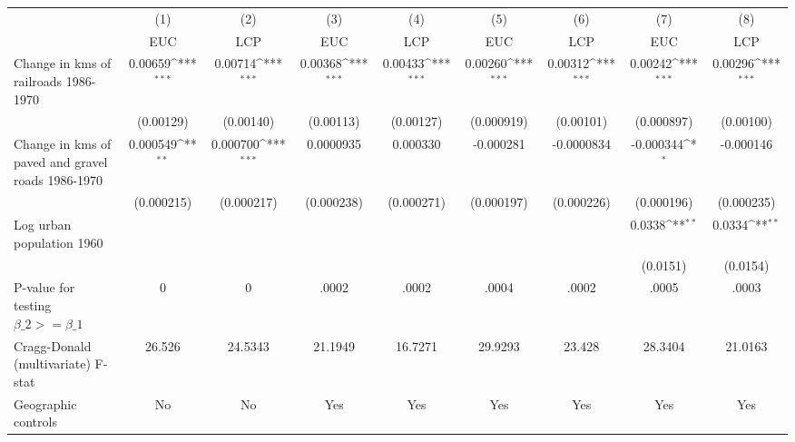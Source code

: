 {
\def\sym#1{\ifmmode^{#1}\else\(^{#1}\)\fi}
\begin{tabular}{l*{8}{c}}
\hline\hline
                &\multicolumn{1}{c}{(1)}&\multicolumn{1}{c}{(2)}&\multicolumn{1}{c}{(3)}&\multicolumn{1}{c}{(4)}&\multicolumn{1}{c}{(5)}&\multicolumn{1}{c}{(6)}&\multicolumn{1}{c}{(7)}&\multicolumn{1}{c}{(8)}\\
                &\multicolumn{1}{c}{EUC}&\multicolumn{1}{c}{LCP}&\multicolumn{1}{c}{EUC}&\multicolumn{1}{c}{LCP}&\multicolumn{1}{c}{EUC}&\multicolumn{1}{c}{LCP}&\multicolumn{1}{c}{EUC}&\multicolumn{1}{c}{LCP}\\
\hline
Change in kms of railroads 1986-1970&  0.00659\sym{***}&  0.00714\sym{***}&  0.00368\sym{***}&  0.00433\sym{***}&  0.00260\sym{***}&  0.00312\sym{***}&  0.00242\sym{***}&  0.00296\sym{***}\\
                &(0.00129)         &(0.00140)         &(0.00113)         &(0.00127)         &(0.000919)         &(0.00101)         &(0.000897)         &(0.00100)         \\
[1em]
Change in kms of paved and gravel roads 1986-1970& 0.000549\sym{**} & 0.000700\sym{***}&0.0000935         & 0.000330         &-0.000281         &-0.0000834         &-0.000344\sym{*}  &-0.000146         \\
                &(0.000215)         &(0.000217)         &(0.000238)         &(0.000271)         &(0.000197)         &(0.000226)         &(0.000196)         &(0.000235)         \\
[1em]
Log urban population 1960&                  &                  &                  &                  &                  &                  &   0.0338\sym{**} &   0.0334\sym{**} \\
                &                  &                  &                  &                  &                  &                  & (0.0151)         & (0.0154)         \\
\hline
P-value for testing $\beta\_{2} >= \beta\_{1}$&        0         &        0         &    .0002         &    .0002         &    .0004         &    .0002         &    .0005         &    .0003         \\
Cragg-Donald (multivariate) F-stat&   26.526         &  24.5343         &  21.1949         &  16.7271         &  29.9293         &   23.428         &  28.3404         &  21.0163         \\
Geographic controls&       No         &       No         &      Yes         &      Yes         &      Yes         &      Yes         &      Yes         &      Yes         \\

\end{tabular}}
